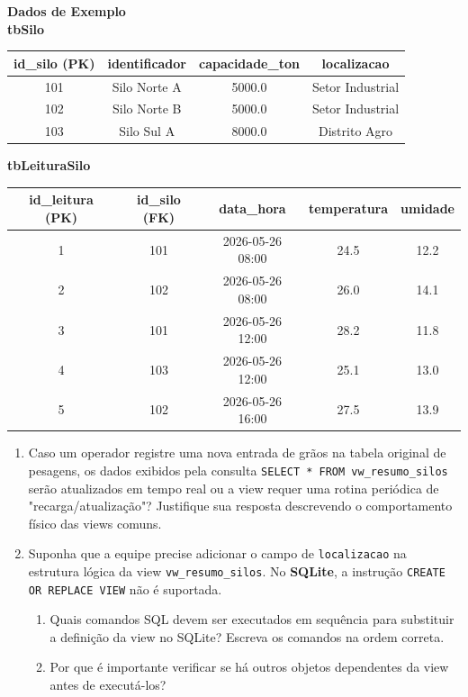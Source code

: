 \documentclass[12pt,a4paper]{article}
\newcommand{\resposta}[1]{}
\begin{document}
\begin{enumerate}[label=\textbf{Exercício \arabic* -}, leftmargin=*, itemsep=2.5em]
\begin{center}
    \textbf{Dados de Exemplo} \\[0.2cm]
    \textbf{tbSilo} \\[0.1cm]
    \begin{tabular}{|c|c|c|c|}
        \hline
        \textbf{id\_silo (PK)} & \textbf{identificador} & \textbf{capacidade\_ton} & \textbf{localizacao} \\
        \hline
        101 & Silo Norte A & 5000.0 & Setor Industrial \\
        102 & Silo Norte B & 5000.0 & Setor Industrial \\
        103 & Silo Sul A & 8000.0 & Distrito Agro \\
        \hline
    \end{tabular}
    \vspace{0.2cm}
    
    \textbf{tbLeituraSilo} \\[0.1cm]
    \begin{tabular}{|c|c|c|c|c|}
        \hline
        \textbf{id\_leitura (PK)} & \textbf{id\_silo (FK)} & \textbf{data\_hora} & \textbf{temperatura} & \textbf{umidade} \\
        \hline
        1 & 101 & 2026-05-26 08:00 & 24.5 & 12.2 \\
        2 & 102 & 2026-05-26 08:00 & 26.0 & 14.1 \\
        3 & 101 & 2026-05-26 12:00 & 28.2 & 11.8 \\
        4 & 103 & 2026-05-26 12:00 & 25.1 & 13.0 \\
        5 & 102 & 2026-05-26 16:00 & 27.5 & 13.9 \\
        \hline
    \end{tabular}
\end{center}

\begin{enumerate}[label=\textbf{\alph*)}]
    \item Caso um operador registre uma nova entrada de grãos na tabela original de pesagens, os dados exibidos pela consulta \texttt{SELECT * FROM vw\_resumo\_silos} serão atualizados em tempo real ou a view requer uma rotina periódica de "recarga/atualização"? Justifique sua resposta descrevendo o comportamento físico das views comuns.
    \resposta{3cm}

    \item Suponha que a equipe precise adicionar o campo de \texttt{localizacao} na estrutura lógica da view \texttt{vw\_resumo\_silos}. No \textbf{SQLite}, a instrução \texttt{CREATE OR REPLACE VIEW} não é suportada.
    \begin{enumerate}[label=\arabic*.]
        \item Quais comandos SQL devem ser executados em sequência para substituir a definição da view no SQLite? Escreva os comandos na ordem correta.
        \item Por que é importante verificar se há outros objetos dependentes da view antes de executá-los?
    \end{enumerate}
    \resposta{4.5cm}
\end{enumerate}



\end{enumerate}
\end{document}
